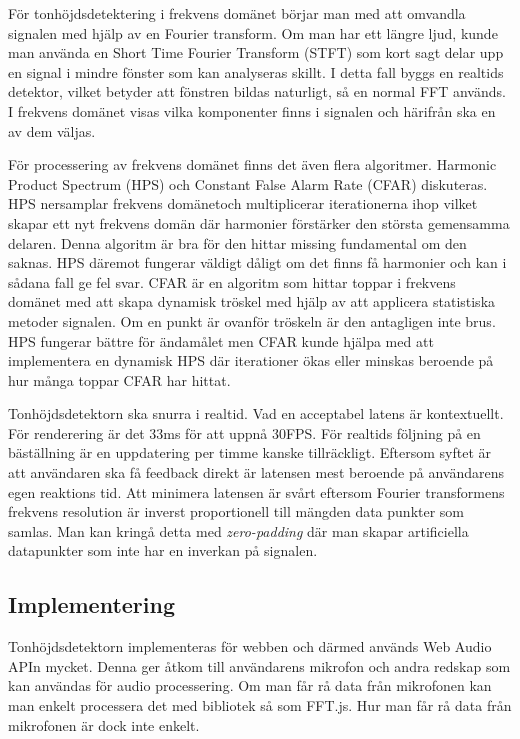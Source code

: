 För tonhöjdsdetektering i frekvens domänet börjar man med att omvandla signalen med hjälp av en Fourier transform. Om man har ett längre ljud, kunde man använda en Short Time Fourier Transform (STFT) som kort sagt delar upp en signal i mindre fönster som kan analyseras skillt. I detta fall byggs en realtids detektor, vilket betyder att fönstren bildas naturligt, så en normal FFT används. I frekvens domänet visas vilka komponenter finns i signalen och härifrån ska en av dem väljas.

För processering av frekvens domänet finns det även flera algoritmer. Harmonic Product Spectrum (HPS) och Constant False Alarm Rate (CFAR) diskuteras. HPS nersamplar frekvens domänetoch multiplicerar iterationerna ihop vilket skapar ett nyt frekvens domän där harmonier förstärker den största gemensamma delaren. Denna algoritm är bra för den hittar missing fundamental om den saknas. HPS däremot fungerar väldigt dåligt om det finns få harmonier och kan i sådana fall ge fel svar. CFAR är en algoritm som hittar toppar i frekvens domänet med att skapa dynamisk tröskel med hjälp av att applicera statistiska metoder signalen. Om en punkt är ovanför tröskeln är den antagligen inte brus. HPS fungerar bättre för ändamålet men CFAR kunde hjälpa med att implementera en dynamisk HPS där iterationer ökas eller minskas beroende på hur många toppar CFAR har hittat. 

Tonhöjdsdetektorn ska snurra i realtid. Vad en acceptabel latens är kontextuellt. För renderering är det 33ms för att uppnå 30FPS. För realtids följning på en bäställning är en uppdatering per timme kanske tillräckligt. Eftersom syftet är att användaren ska få feedback direkt är latensen mest beroende på användarens egen reaktions tid. Att minimera latensen är svårt eftersom Fourier transformens frekvens resolution är inverst proportionell till mängden data punkter som samlas. Man kan kringå detta med \textit{zero-padding} där man skapar artificiella datapunkter som inte har en inverkan på signalen. 
\subsection{Implementering}
Tonhöjdsdetektorn implementeras för webben och därmed används Web Audio APIn mycket. Denna ger åtkom till användarens mikrofon och andra redskap som kan användas för audio processering. Om man får rå data från mikrofonen kan man enkelt processera det med bibliotek så som FFT.js. Hur man får rå data från mikrofonen är dock inte enkelt. 


